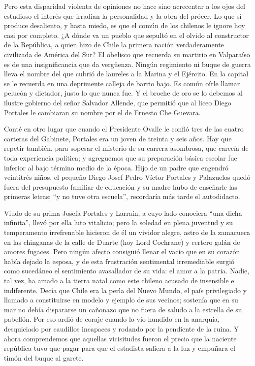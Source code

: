 \documentclass[10pt,twoside,openright]{memoir}
\begin{document}
Pero esta disparidad violenta de opiniones no hace sino acrecentar a los
ojos del estudioso el interés que irradian la personalidad y la obra del
prócer. Lo que sí produce desaliento,
y hasta miedo, es que el común de los chilenos le ignore hoy casi por
completo. ¿A dónde va un pueblo que sepultó en el olvido al constructor
de la República, a quien hizo de Chile
la primera nación verdaderamente
civilizada de América del Sur? El
obelisco que recuerda su martirio en Valparaíso es de una
insignificancia que da vergüenza. Ningún regimiento ni buque de guerra
lleva el nombre del que cubrió de laureles a la Marina y el Ejército. En
la capital se le recuerda en una deprimente calleja de barrio bajo. Es
común oírle llamar pelucón y dictador, justo lo que nunca fue. Y el
broche de oro se lo debemos al ilustre gobierno del señor Salvador
Allende, que permitió que al liceo Diego Portales le cambiaran su nombre
por el de Ernesto Che Guevara.

Conté en otro lugar que cuando cl Presidente Ovalle le confió tres de
las cuatro carteras del Gabinete, Portales era un joven de treinta y
seis años. Hay que repetir también, para sopesar el misterio de su
carrera asombrosa, que carecía de toda experiencia política; y
agreguemos que su preparación básica escolar fue inferior al bajo
término medio de la época. Hijo de un padre que engendró veintitrés
niños, el pequeño Diego Josef Pedro Víctor Portales y Palazuelos quedó
fuera del presupuesto familiar de educación y su madre hubo de enseñarle
las primeras letras; ``y no tuve otra escuela'', recordaría más tarde el
autodidacto.

Viudo de su prima Josefa Portales y Larraín, a
cuyo lado conociera ``una dicha
infinita'', llevó por ella luto vitalicio; pero la soledad en plena
juventud y su temperamento irrefrenable hicieron de él un vividor
alegre, astro de la zamacueca en las chinganas de la calle de Duarte
(hoy Lord Cochrane) y certero galán de amores fugaces. Pero ningún
afecto consiguió llenar el vacío que en su corazón había dejado la
esposa, y de esta frustración sentimental irremediable surgió como
sucedáneo el sentimiento avasallador de su vida: el amor a la patria.
Nadie, tal vez, ha amado a la tierra natal como este chileno acusado de
insensible e indiferente. Decía que Chile era la perla del Nuevo Mundo,
el país privilegiado y llamado a constituirse en modelo y ejemplo de sus
vecinos; sostenía que en su mar no debía dispararse un cañonazo que no
fuera de saludo a la estrella de su pabellón. Por eso ardió de coraje
cuando lo vio hundido en la anarquía, desquiciado por caudillos
incapaces y rodando por la
pendiente de la ruina. Y ahora comprendemos que aquellas vicisitudes
fueron el precio que la naciente república tuvo que pagar para que el
estadista saliera a la luz y empuñara el timón del buque al garete.
\end{document}
